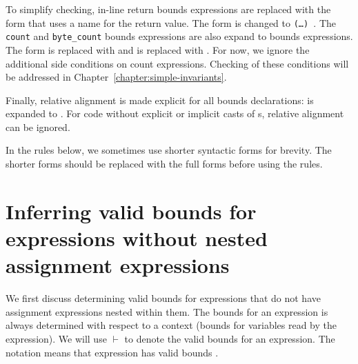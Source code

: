 To simplify checking, in-line return bounds expressions are replaced
with the form that uses a name for the return value. The form
 is changed to 
\texttt{(\ldots{}) 
  }.
The \texttt{count} and
\texttt{byte\_count} bounds expressions are also expand to bounds expressions.
The form 
is replaced with 
and 
is replaced with . For now, we ignore the
additional side conditions on count expressions. Checking of these
conditions will be addressed in Chapter~\ref{chapter:simple-invariants}.

Finally, relative alignment is made explicit for all bounds
declarations:  is expanded to
.
For code without explicit or implicit casts of \arrayptr s, relative
alignment can be ignored.

In the rules below, we sometimes use shorter syntactic forms for
brevity. The shorter forms should be replaced with the full forms before
using the rules.

\section{Inferring valid bounds for expressions without nested assignment expressions}
\label{section:inferring-expression-bounds}

We first discuss determining valid bounds for expressions that do not
have assignment expressions nested within them. The bounds for an
expression is always determined with respect to a context (bounds for
variables read by the expression). We will use $\vdash$ to denote the
valid bounds for an expression. The notation 
means that expression  has valid bounds .

